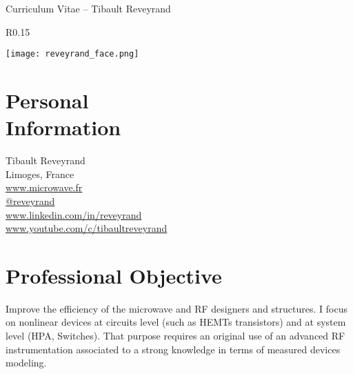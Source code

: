 \documentclass[margin,line]{resume}
\begin{document}
{\sc \Large Curriculum Vitae -- Tibault Reveyrand}
\begin{resume}


    \vspace{0.5cm}
    \begin{wrapfigure}{R}{0.15\textwidth}
         \vspace{-0.9cm}
        \begin{center}
        \texttt{[image: reveyrand\_face.png]}
        \end{center}
         \vspace{-1cm}
    \end{wrapfigure}


    \section{\mysidestyle Personal\\Information}
    Tibault Reveyrand \\
    Limoges, France\\
    \faTv  \space \href{http://www.microwave.fr}{www.microwave.fr} \\
    \faTwitter  \space \href{https://twitter.com/reveyrand/}{@reveyrand} \\
    \faLinkedin \space \href{http://www.linkedin.com/in/reveyrand/}{www.linkedin.com/in/reveyrand} \\
    \faYoutubePlay  \space \href{https://www.youtube.com/c/tibaultreveyrand/}{www.youtube.com/c/tibaultreveyrand}


    \section{\mysidestyle Professional Objective}
    Improve the efficiency of the microwave and RF designers and structures. I focus on nonlinear devices at circuits level (such as HEMTs transistors) and at system level (HPA, Switches). That purpose requires an original use of an advanced RF instrumentation associated to a strong knowledge in terms of measured devices modeling.



\end{resume}
\end{document}
